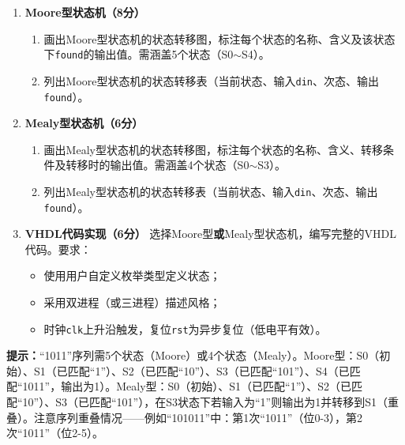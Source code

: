 \begin{enumerate}[label=(\arabic*)]
  \item \textbf{Moore型状态机（8分）}
  \begin{enumerate}
    \item 画出Moore型状态机的状态转移图，标注每个状态的名称、含义及该状态下\texttt{found}的输出值。需涵盖5个状态（S0$\sim$S4）。
    \item 列出Moore型状态机的状态转移表（当前状态、输入\texttt{din}、次态、输出\texttt{found}）。
  \end{enumerate}

  \item \textbf{Mealy型状态机（6分）}
  \begin{enumerate}
    \item 画出Mealy型状态机的状态转移图，标注每个状态的名称、含义、转移条件及转移时的输出值。需涵盖4个状态（S0$\sim$S3）。
    \item 列出Mealy型状态机的状态转移表（当前状态、输入\texttt{din}、次态、输出\texttt{found}）。
  \end{enumerate}

  \item \textbf{VHDL代码实现（6分）}
  选择Moore型\textbf{或}Mealy型状态机，编写完整的VHDL代码。要求：
  \begin{itemize}
    \item 使用用户自定义枚举类型定义状态；
    \item 采用双进程（或三进程）描述风格；
    \item 时钟\texttt{clk}上升沿触发，复位\texttt{rst}为异步复位（低电平有效）。
  \end{itemize}
\end{enumerate}

\begin{framed}
\textbf{提示：}``1011''序列需5个状态（Moore）或4个状态（Mealy）。Moore型：S0（初始）、S1（已匹配``1''）、S2（已匹配``10''）、S3（已匹配``101''）、S4（已匹配``1011''，输出为1）。Mealy型：S0（初始）、S1（已匹配``1''）、S2（已匹配``10''）、S3（已匹配``101''），在S3状态下若输入为``1''则输出为1并转移到S1（重叠）。注意序列重叠情况——例如``101011''中：第1次``1011''（位0-3），第2次``1011''（位2-5）。
\end{framed}

\endinput
